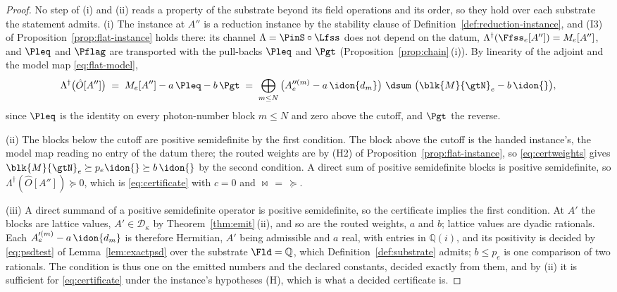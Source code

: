 \begin{proof}
No step of (i) and (ii) reads a property of the substrate beyond its
field operations and its order, so they hold over each substrate the
statement admits. (i) The instance at $A''$ is a reduction instance by the stability clause
of Definition~\ref{def:reduction-instance}, and (I3) of
Proposition~\ref{prop:flat-instance} holds there: its channel
$\Lambda=\PinS\circ\Lfss$ does not depend on the datum,
$\Lambda^{\dagger}(\Ffss_e[A''])=M_e[A'']$, and $\Pleq$ and $\Pflag$ are
transported with the pull-backs $\Pleq$ and $\Pgt$
(Proposition~\ref{prop:chain}\,(i)). By linearity of the adjoint and the
model map \eqref{eq:flat-model},
\begin{equation*}
  \Lambda^{\dagger}\big(\hat O[A'']\big)
  \;=\;M_e[A'']-a\,\Pleq-b\,\Pgt
  \;=\;\bigoplus_{m\le N}\big(A''^{(m)}_e-a\,\idon{d_m}\big)
  \ \dsum\ \big(\blk{M}{\gtN}_e-b\,\idon{}\big),
\end{equation*}
since $\Pleq$ is the identity on every photon-number block $m\le N$ and zero
above the cutoff, and $\Pgt$ the reverse.

(ii) The blocks below the cutoff are positive semidefinite by the first
condition. The block above the cutoff is the handed instance's, the model
map reading no entry of the datum there; the routed weights are
 by (H2) of Proposition~\ref{prop:flat-instance}, so
\eqref{eq:certweights} gives $\blk{M}{\gtN}_e\succeq p_e\idon{}\succeq
b\,\idon{}$ by the second condition. A direct sum of positive semidefinite
blocks is positive semidefinite, so $\Lambda^{\dagger}(\hat O[A''])\succeq0$,
which is \eqref{eq:certificate} with $c=0$ and $\bowtie\,=\,\succeq$.

(iii) A direct summand of a positive semidefinite operator is positive
semidefinite, so the certificate implies the first condition. At $A'$ the
blocks are lattice values, $A'\in\mathcal{D}_{\kappa}$ by
Theorem~\ref{thm:emit}\,(ii), and so are the routed weights, $a$ and $b$;
lattice values are dyadic rationals. Each $A'^{(m)}_e-a\,\idon{d_m}$ is
therefore Hermitian, $A'$ being admissible and $a$ real, with entries in
$\mathbb{Q}(i)$, and its positivity is decided by \eqref{eq:psdtest} of
Lemma~\ref{lem:exactpsd} over the substrate $\Fld=\mathbb{Q}$, which
Definition~\ref{def:substrate} admits; $b\le p_e$ is one comparison of two
rationals. The condition is thus one on the emitted numbers and the declared
constants, decided exactly from them, and by (ii) it is sufficient for
\eqref{eq:certificate} under the instance's hypotheses (H), which is what a
decided certificate is.
\end{proof}
